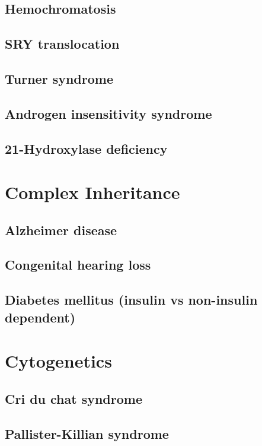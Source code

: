 \documentclass{scrartcl}
\begin{document}
\subsection{Hemochromatosis}
\label{sec:orgd91b881}
\subsection{SRY translocation}
\label{sec:org9883dad}
\subsection{Turner syndrome}
\label{sec:org9743502}
\subsection{Androgen insensitivity syndrome}
\label{sec:org45433f8}
\subsection{21-Hydroxylase deficiency}
\label{sec:orge794e29}

\section{Complex Inheritance}
\label{sec:org6a71ce1}
\subsection{Alzheimer disease}
\label{sec:orgd023eb2}
\subsection{Congenital hearing loss}
\label{sec:orga1738cb}
\subsection{Diabetes mellitus (insulin vs non-insulin dependent)}
\label{sec:orgc0451d1}

\section{Cytogenetics}
\label{sec:orgd20ecd1}
\subsection{Cri du chat syndrome}
\label{sec:org4e8b9b4}
\subsection{Pallister-Killian syndrome}
\label{sec:org8667588}
\end{document}
